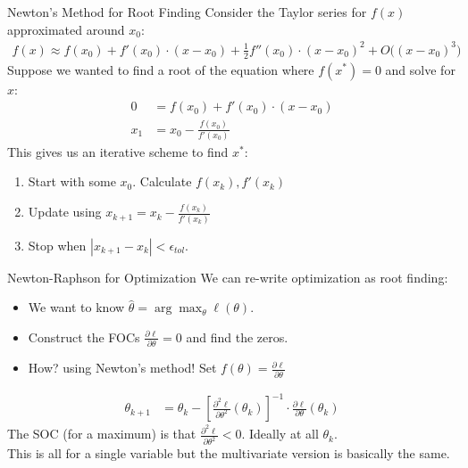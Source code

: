 \documentclass[aspectratio=169,11pt]{beamer}
\begin{document}
\begin{frame}{Newton's Method for Root Finding}
Consider the Taylor series for $f(x)$ approximated around $x_0$:
\begin{align*}
f(x) \approx f(x_0) + f'(x_0) \cdot (x-x_0) + \tfrac{1}{2} f''(x_0) \cdot (x-x_0)^2 + O\big((x-x_0)^3\big)
\end{align*}
Suppose we wanted to find a \alert{root} of the equation where $f(x^{*})=0$ and solve for $x$:
\begin{align*}
0 &= f(x_0) + f'(x_0) \cdot (x-x_0) \\
x_1 &= x_0-\frac{f(x_0)}{f'(x_0)} 
\end{align*}
This gives us an \alert{iterative} scheme to find $x^{*}$:
\begin{enumerate}
\item Start with some $x_0$. Calculate $f(x_k),f'(x_k)$
\item Update using $x_{k+1} = x_k - \frac{f(x_k)}{f'(x_k)} $
\item Stop when $|x_{k+1}-x_{k}| < \epsilon_{tol}$.
\end{enumerate}
\end{frame}

\begin{frame}{Newton-Raphson for Optimization}
We can re-write \alert{optimization} as \alert{root finding}:
\begin{itemize}
\item We want to know $\hat{\theta} = \arg \max_{\theta} \ell(\theta)$.
\item Construct the FOCs $\frac{\partial \ell}{\partial \theta}=0$ and find the zeros.
\item How? using Newton's method! Set $f(\theta) = \frac{\partial \ell}{\partial \theta}$
\end{itemize}
\begin{align*}
\theta_{k+1} &= \theta_k -  \left[ \frac{\partial^2 \ell}{\partial \theta^2}(\theta_k) \right]^{-1} \cdot \frac{\partial \ell}{\partial \theta}(\theta_k)
\end{align*}
The SOC (for a maximum) is that $ \frac{\partial^2 \ell}{\partial \theta^2} <0$. Ideally at all $\theta_k$.\\
This is all for a \alert{single variable} but the \alert{multivariate} version is basically the same.
\end{frame}
\end{document}
